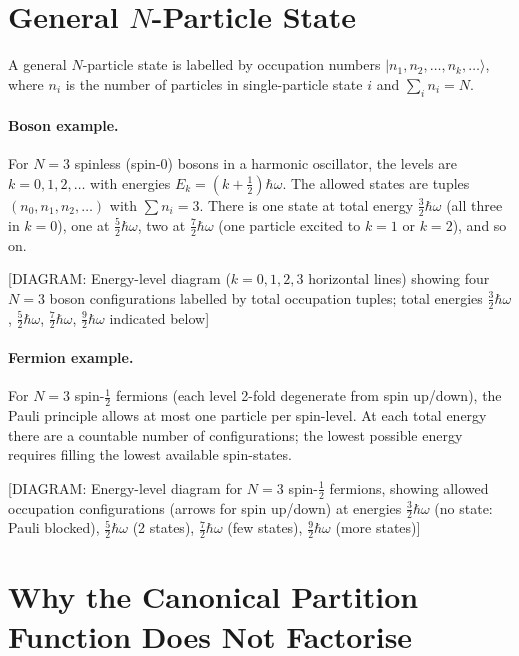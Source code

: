 \section{General $N$-Particle State}

A general $N$-particle state is labelled by occupation numbers
$|n_1, n_2, \ldots, n_k, \ldots\rangle$, where $n_i$ is the number of particles
in single-particle state $i$ and $\sum_i n_i = N$.

\paragraph{Boson example.}  For $N=3$ spinless (spin-0) bosons in a harmonic
oscillator, the levels are $k=0,1,2,\ldots$ with energies
$E_k=(k+\tfrac{1}{2})\hbar\omega$.  The allowed states are tuples $(n_0,n_1,n_2,\ldots)$
with $\sum n_i = 3$.  There is one state at total energy $\tfrac{3}{2}\hbar\omega$
(all three in $k=0$), one at $\tfrac{5}{2}\hbar\omega$, two at $\tfrac{7}{2}\hbar\omega$
(one particle excited to $k=1$ or $k=2$), and so on.

\begin{center}
[DIAGRAM: Energy-level diagram ($k=0,1,2,3$ horizontal lines) showing four
$N=3$ boson configurations labelled by total occupation tuples; total energies
$\tfrac{3}{2}\hbar\omega$, $\tfrac{5}{2}\hbar\omega$, $\tfrac{7}{2}\hbar\omega$,
$\tfrac{9}{2}\hbar\omega$ indicated below]
\end{center}

\paragraph{Fermion example.}  For $N=3$ spin-$\tfrac{1}{2}$ fermions (each level
2-fold degenerate from spin up/down), the Pauli principle allows at most one
particle per spin-level.  At each total energy there are a countable number of
configurations; the lowest possible energy requires filling the lowest available
spin-states.

\begin{center}
[DIAGRAM: Energy-level diagram for $N=3$ spin-$\tfrac{1}{2}$ fermions, showing
allowed occupation configurations (arrows for spin up/down) at energies
$\tfrac{3}{2}\hbar\omega$ (no state: Pauli blocked), $\tfrac{5}{2}\hbar\omega$
(2 states), $\tfrac{7}{2}\hbar\omega$ (few states), $\tfrac{9}{2}\hbar\omega$
(more states)]
\end{center}

\section{Why the Canonical Partition Function Does Not Factorise}

